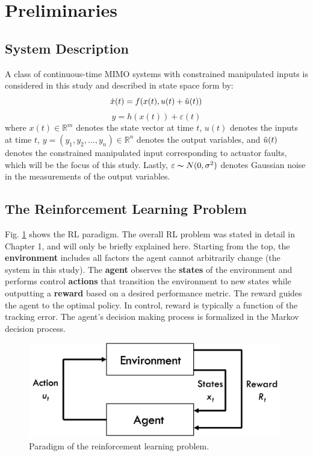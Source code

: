 \section{Preliminaries}
\subsection{System Description}
A class of continuous-time MIMO systems with constrained manipulated inputs is considered in this study and described in state space form by:
\begin{equation}
\dot{x}(t) = f(x(t), u(t) + \Tilde{u}(t))
\label{eq:system_states}
\end{equation}
\begin{equation}
y = h(x(t)) + \varepsilon(t)
\label{eq:system_output}
\end{equation}
where $x(t) \in {\mathbb{R}}^m$ denotes the state vector at time $t$, $u(t)$ denotes the inputs at time $t$, $y = (y_{1}, y_{2}, ..., y_{n}) \in {\mathbb{R}}^n$ denotes the output variables, and $\Tilde{u}(t)$ denotes the constrained manipulated input corresponding to actuator faults, which will be the focus of this study. Lastly, $\varepsilon \thicksim N(0, \sigma^2)$ denotes Gaussian noise in the measurements of the output variables.

\subsection{The Reinforcement Learning Problem}
Fig. \ref{fig:MDP_Setup} shows the RL paradigm. The overall RL problem was stated in detail in Chapter 1, and will only be briefly explained here. Starting from the top, the \textbf{environment} includes all factors the agent cannot arbitrarily change (the system in this study). The \textbf{agent} observes the \textbf{states} of the environment and performs control \textbf{actions} that transition the environment to new states while outputting a \textbf{reward} based on a desired performance metric. The reward guides the agent to the optimal policy. In control, reward is typically a function of the tracking error. The agent's decision making process is formalized in the Markov decision process.
\begin{figure}[H]
    \begin{center}
        \includegraphics[width=11cm]{images/ftc/MDP_Setup.png}
        \caption{\label{fig:MDP_Setup} Paradigm of the reinforcement learning problem.}
    \end{center}
\end{figure}

